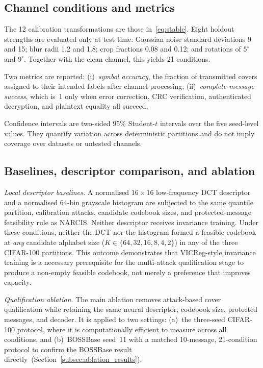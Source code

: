 ﻿\documentclass[10pt,journal]{IEEEtran}
\newcommand{\method}{NARCIS\xspace}
\begin{document}
\subsection{Channel conditions and metrics}

The 12 calibration transformations are those in~\eqref{eq:stable}.
Eight holdout strengths are evaluated only at test time: Gaussian
noise standard deviations 9 and 15; blur radii 1.2 and 1.8; crop
fractions 0.08 and 0.12; and rotations of $5^\circ$ and $9^\circ$.
Together with the clean channel, this yields 21 conditions.

Two metrics are reported: (i)~\emph{symbol accuracy}, the fraction of
transmitted covers assigned to their intended labels after channel
processing; (ii)~\emph{complete-message success}, which is~1 only when
error correction, CRC verification, authenticated decryption, and
plaintext equality all succeed.

Confidence intervals are two-sided 95\% Student-$t$ intervals over the
five seed-level values. They quantify variation across deterministic
partitions and do not imply coverage over datasets or untested channels.

\subsection{Baselines, descriptor comparison, and ablation}
\label{subsec:ablation}

\textit{Local descriptor baselines.} A normalised $16\times16$
low-frequency DCT descriptor and a normalised 64-bin grayscale
histogram are subjected to the same quantile partition, calibration
attacks, candidate codebook sizes, and protected-message feasibility
rule as \method. Neither descriptor receives invariance training.
Under these conditions, neither the DCT nor the histogram formed a
feasible codebook at \emph{any} candidate alphabet size ($K\in
\{64,32,16,8,4,2\}$) in any of the three CIFAR-100 partitions. This
outcome demonstrates that VICReg-style invariance training is a
necessary prerequisite for the multi-attack qualification stage to
produce a non-empty feasible codebook, not merely a preference that
improves capacity.

\textit{Qualification ablation.} The main ablation removes attack-based
cover qualification while retaining the same neural descriptor, codebook
size, protected messages, and decoder. It is applied to two settings:
(a)~the three-seed CIFAR-100 protocol, where it is computationally
efficient to measure across all conditions, and (b)~BOSSBase seed~11
with a matched 10-message, 21-condition protocol to confirm the
BOSSBase result directly~(Section~\ref{subsec:ablation_results}).
\end{document}
